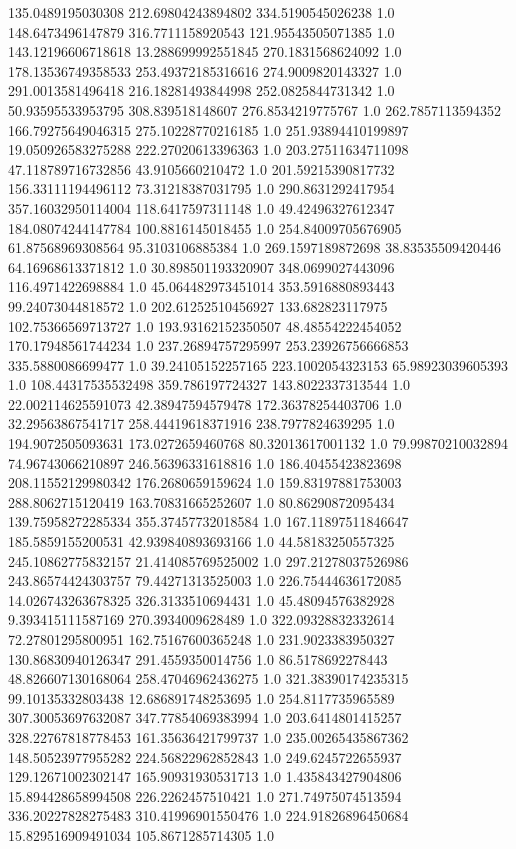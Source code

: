 135.0489195030308	212.69804243894802	334.5190545026238	1.0
148.6473496147879	316.7711158920543	121.95543505071385	1.0
143.12196606718618	13.288699992551845	270.1831568624092	1.0
178.13536749358533	253.49372185316616	274.9009820143327	1.0
291.0013581496418	216.18281493844998	252.0825844731342	1.0
50.93595533953795	308.839518148607	276.8534219775767	1.0
262.7857113594352	166.79275649046315	275.10228770216185	1.0
251.93894410199897	19.050926583275288	222.27020613396363	1.0
203.27511634711098	47.118789716732856	43.9105660210472	1.0
201.59215390817732	156.33111194496112	73.31218387031795	1.0
290.8631292417954	357.16032950114004	118.6417597311148	1.0
49.42496327612347	184.08074244147784	100.8816145018455	1.0
254.84009705676905	61.87568969308564	95.3103106885384	1.0
269.1597189872698	38.83535509420446	64.16968613371812	1.0
30.898501193320907	348.0699027443096	116.4971422698884	1.0
45.064482973451014	353.5916880893443	99.24073044818572	1.0
202.61252510456927	133.682823117975	102.75366569713727	1.0
193.93162152350507	48.48554222454052	170.17948561744234	1.0
237.26894757295997	253.23926756666853	335.5880086699477	1.0
39.24105152257165	223.1002054323153	65.98923039605393	1.0
108.44317535532498	359.786197724327	143.8022337313544	1.0
22.002114625591073	42.38947594579478	172.36378254403706	1.0
32.29563867541717	258.44419618371916	238.7977824639295	1.0
194.9072505093631	173.0272659460768	80.32013617001132	1.0
79.99870210032894	74.96743066210897	246.56396331618816	1.0
186.40455423823698	208.11552129980342	176.2680659159624	1.0
159.83197881753003	288.8062715120419	163.70831665252607	1.0
80.86290872095434	139.75958272285334	355.37457732018584	1.0
167.11897511846647	185.5859155200531	42.939840893693166	1.0
44.58183250557325	245.10862775832157	21.414085769525002	1.0
297.21278037526986	243.86574424303757	79.44271313525003	1.0
226.75444636172085	14.026743263678325	326.3133510694431	1.0
45.48094576382928	9.393415111587169	270.3934009628489	1.0
322.09328832332614	72.27801295800951	162.75167600365248	1.0
231.9023383950327	130.86830940126347	291.4559350014756	1.0
86.5178692278443	48.826607130168064	258.47046962436275	1.0
321.38390174235315	99.10135332803438	12.686891748253695	1.0
254.8117735965589	307.30053697632087	347.77854069383994	1.0
203.6414801415257	328.22767818778453	161.35636421799737	1.0
235.00265435867362	148.50523977955282	224.56822962852843	1.0
249.6245722655937	129.12671002302147	165.90931930531713	1.0
1.435843427904806	15.894428658994508	226.2262457510421	1.0
271.74975074513594	336.20227828275483	310.41996901550476	1.0
224.91826896450684	15.829516909491034	105.8671285714305	1.0
